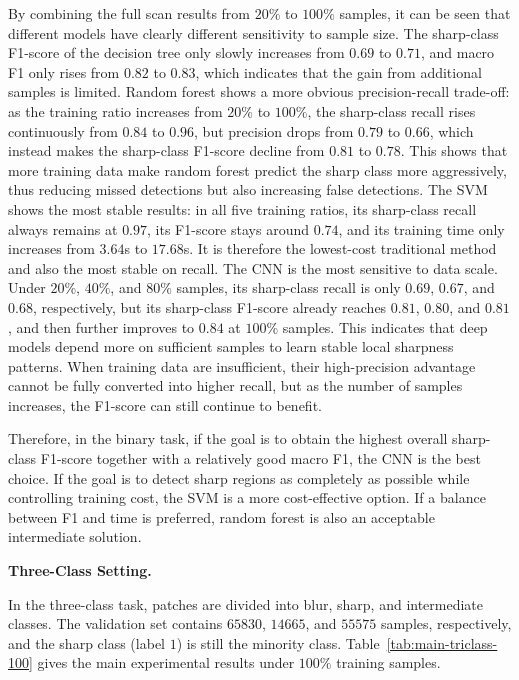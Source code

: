 \par By combining the full scan results from $20\%$ to $100\%$ samples, it can
be seen that different models have clearly different sensitivity to sample
size. The sharp-class F1-score of the decision tree only slowly increases from
$0.69$ to $0.71$, and macro F1 only rises from $0.82$ to $0.83$, which
indicates that the gain from additional samples is limited. Random forest shows
a more obvious precision-recall trade-off: as the training ratio increases
from $20\%$ to $100\%$, the sharp-class recall rises continuously from $0.84$
to $0.96$, but precision drops from $0.79$ to $0.66$, which instead makes the
sharp-class F1-score decline from $0.81$ to $0.78$. This shows that more
training data make random forest predict the sharp class more aggressively,
thus reducing missed detections but also increasing false detections. The SVM
shows the most stable results: in all five training ratios, its sharp-class
recall always remains at $0.97$, its F1-score stays around $0.74$, and its
training time only increases from $3.64$s to $17.68$s. It is therefore the
lowest-cost traditional method and also the most stable on recall. The CNN is
the most sensitive to data scale. Under $20\%$, $40\%$, and $80\%$ samples,
its sharp-class recall is only $0.69$, $0.67$, and $0.68$, respectively, but
its sharp-class F1-score already reaches $0.81$, $0.80$, and $0.81$, and then
further improves to $0.84$ at $100\%$ samples. This indicates that deep models
depend more on sufficient samples to learn stable local sharpness patterns.
When training data are insufficient, their high-precision advantage cannot be
fully converted into higher recall, but as the number of samples increases,
the F1-score can still continue to benefit.

\par Therefore, in the binary task, if the goal is to obtain the highest
overall sharp-class F1-score together with a relatively good macro F1, the CNN
is the best choice. If the goal is to detect sharp regions as completely as
possible while controlling training cost, the SVM is a more cost-effective
option. If a balance between F1 and time is preferred, random forest is also an
acceptable intermediate solution.

\par\medskip \noindent\textbf{Three-Class Setting.} \par In the three-class
task, patches are divided into blur, sharp, and intermediate classes. The
validation set contains $65830$, $14665$, and $55575$ samples, respectively,
and the sharp class (label $1$) is still the minority class.
Table~\ref{tab:main-triclass-100} gives the main experimental results under
$100\%$ training samples.

